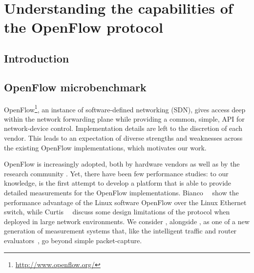\chapter{Understanding the capabilities of the OpenFlow protocol}
\ifpdf
    \graphicspath{{Chapter1/Chapter1Figs/PNG/}{Chapter1/Chapter1Figs/PDF/}{Chapter1/Chapter1Figs/}}
\else
    \graphicspath{{Chapter1/Chapter1Figs/EPS/}{Chapter1/Chapter1Figs/}}
\fi



\section{Introduction}




\section {OpenFlow microbenchmark}

OpenFlow\footnote{\url{http://www.openflow.org/}}, an instance of 
software-defined networking (SDN), gives access deep within the network
forwarding plane while providing a common, simple, API for
network-device control. Implementation details are left to the discretion
of each vendor. This leads to an expectation of diverse strengths and 
weaknesses across the existing OpenFlow implementations, which motivates 
our work.

OpenFlow is increasingly adopted, both by hardware vendors as well as
by the research community
\cite{plug_n_serv,difane,flowvisor-osdi}. Yet, there have been few
performance studies: to our knowledge, \oflops is the first attempt to
develop a platform that is able to provide detailed measurements for
the OpenFlow implementations. Bianco~\etal~\cite{bianco10} show the
performance advantage of the Linux software OpenFlow over the Linux
Ethernet switch, while Curtis~\etal~\cite{Devoflow} discuss some design
limitations of the protocol when deployed in large network environments. We consider
\oflops, alongside \cite{freedman2010exact}, as one of a new
generation of measurement systems that, like the intelligent traffic
and router evaluators~\cite{ixia,nx2}, go beyond simple
packet-capture.

